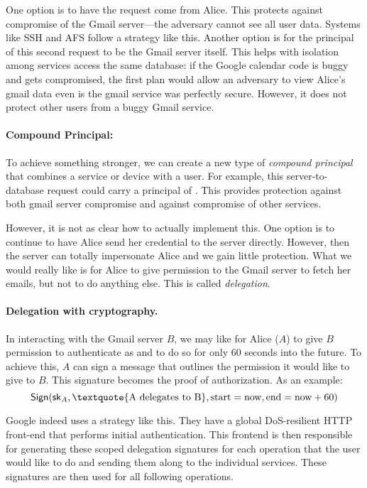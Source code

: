 One option is to have the request come from Alice. This protects against compromise of the Gmail server---the adversary cannot see all user data. Systems like SSH and AFS follow a strategy like this. Another option is for the principal of this second request to be the Gmail server itself. This helps with isolation among services access the same database: if the Google calendar code is buggy and gets compromised, the first plan would allow an adversary to view Alice's gmail data even is the gmail service was perfectly secure. However, it does not protect other users from a buggy Gmail service.

\paragraph{Compound Principal: }
To achieve something stronger, we can create a new type of \emph{compound principal} that combines a service or device with a user. For example, this server-to-database request could carry a principal of . This provides protection against both gmail server compromise and against compromise of other services.

However, it is not as clear how to actually implement this. One option is to continue to have Alice send her credential to the server directly. However, then the server can totally impersonate Alice and we gain little protection. What we would really like is for Alice to give permission to the Gmail server to fetch her emails, but not to do anything else. This is called \emph{delegation}.

\paragraph{Delegation with cryptography.}
In interacting with the Gmail server $B$, we may like for Alice ($A$) to give $B$ permission to authenticate as  and to do so for only 60 seconds into the future. To achieve this, $A$ can sign a message that outlines the permission it would like to give to $B$. This signature becomes the proof of authorization. As an example:
\[ \Sign(\sk_A, \text{\textquote{A delegates to B}}, \text{start}=\text{now}, \text{end}=\text{now}+60) \]

Google indeed uses a strategy like this. They have a global DoS-resilient HTTP front-end that performs initial authentication. This frontend is then responsible for generating these scoped delegation signatures for each operation that the user would like to do and sending them along to the individual services. These signatures are then used for all following operations.

